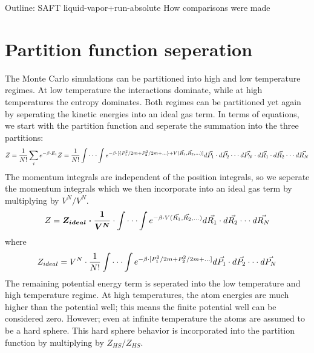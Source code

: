 Outline:
SAFT\newline
liquid-vapor+run-absolute\newline
How comparisons were made\newline
\section{Partition function seperation}
The Monte Carlo simulations can be partitioned into high and low temperature regimes. At low temperature the interactions dominate, while at high temperatures the entropy dominates. Both regimes can be partitioned yet again by seperating the kinetic energies into an ideal gas term. In terms of equations, we start with the partition function and seperate the summation into the three partitions:
$$\newline Z=\frac{1}{N!}\sum_i e^{-\beta\cdot E_i}
\newline Z=\frac{1}{N!}\int\cdot\cdot\cdot\int e^{-\beta\cdot [\{P_{1}^2/{2m}+P_{2}^2/{2m}+...\}+V(\vec{R_1},\vec{R_2},...)]}d\vec{P_1}\cdot d\vec{P_2}\cdot\cdot\cdot d\vec{P_N}\cdot d\vec{R_1}\cdot d\vec{R_2}\cdot\cdot\cdot d\vec{R_N}\newline$$
The momentum integrals are independent of the position integrals, so we seperate the momentum integrals which we then incorporate into an ideal gas term by multiplying by $V^N/V^N$.
$$\newline Z=\boldsymbol{Z_{ideal} \cdot \frac{1}{V^N}}\cdot \int\cdot\cdot\cdot\int e^{-\beta\cdot V(\vec{R_1},\vec{R_2},...)}d\vec{R_1}\cdot d\vec{R_2}\cdot\cdot\cdot d\vec{R_N}\newline$$
where $$Z_{ideal}=V^N\cdot\frac{1}{N!}\int\cdot\cdot\cdot\int e^{-\beta\cdot [P_{1}^2/{2m}+P_{2}^2/{2m}+...]}d\vec{P_1}\cdot d\vec{P_2}\cdot\cdot\cdot d\vec{P_N}\newline$$
The remaining potential energy term is seperated into the low temperature and high temperature regime. At high temperatures, the atom energies are much higher than the potential well; this means the finite potential well can be considered zero. However; even at infinite temperature the atoms are assumed to be a hard sphere. This hard sphere behavior is incorporated into the partition function by multiplying by $Z_{HS}/Z_{HS}$.
